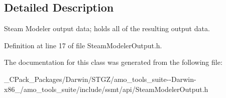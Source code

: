 \subsection{Detailed Description}
Steam Modeler output data; holds all of the resulting output data. 

Definition at line 17 of file Steam\+Modeler\+Output.\+h.



The documentation for this class was generated from the following file\+:\begin{DoxyCompactItemize}
\item 
\+\_\+\+C\+Pack\+\_\+\+Packages/\+Darwin/\+S\+T\+G\+Z/amo\+\_\+tools\+\_\+suite-\/-\/\+Darwin-\/x86\+\_/amo\+\_\+tools\+\_\+suite/include/ssmt/api/Steam\+Modeler\+Output.\+h\end{DoxyCompactItemize}
